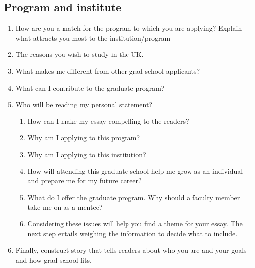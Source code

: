 \documentclass[a4paper,12pt]{article}%
\begin{document}
	  \hrulefill
	  
	  \hrulefill
	  
\subsection{Program and institute}
\label{sec:Program}
  \begin{enumerate}
	\item  How are you a  match  for the program to which you are applying? Explain what attracts you most to the institution/program 
	\item 		 	The reasons you wish to study in the UK.
	\item  	What makes me different from other grad school applicants?
\item  	What can I contribute to the graduate program?\\
	  \hrulefill
	  
	  \hrulefill
	  
\item Who will be reading my personal statement?
 \begin{enumerate}
 	\item How can I make my essay compelling to the readers?
	\item Why am I applying to this program?
	\item Why am I applying to this institution?
	\item How will attending this graduate school help me grow as an individual and prepare me for my future career?
	\item What do I offer the graduate program. Why should a faculty member take me on as a mentee?
	\item Considering these issues will help you find a theme for your essay. The next step entails weighing the information to decide what to include.
\end{enumerate}
	  \hrulefill
	  
	  \hrulefill
	  
\item 	 Finally, construct story that tells readers about who you are and your goals - and how grad school fits.
	\end{enumerate}
	  \hrulefill
	  
	  \hrulefill
	  
	  \hrulefill
	  
\end{document}
